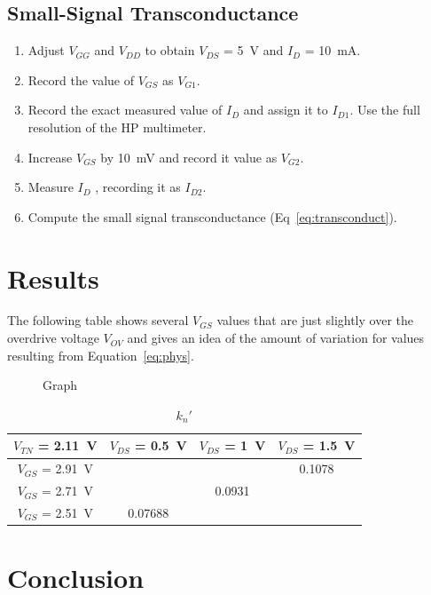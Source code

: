 \subsection{Small-Signal Transconductance}
\label{sec:nand}

\begin{enumerate}
\item Adjust $V_{GG}$ and $V_{DD}$ to obtain $V_{DS}$ = \SI{5}{V} and $I_D$ = \SI{10}{mA}.
\item Record the value of $V_{GS}$ as $V_{G1}$.
\item Record the exact measured value of $I_D$ and assign it to $I_{D1}$. Use the full resolution of the HP multimeter.
\item Increase $V_{GS}$ by \SI{10}{mV} and record it value as $V_{G2}$.
\item Measure $I_D$ , recording it as $I_{D2}$.
\item Compute the small signal transconductance (Eq~\ref{eq:transconduct}).
\end{enumerate}

\section{Results}
\label{sec:results}

The following table shows several $V_{GS}$ values that are just slightly over the overdrive voltage $V_{OV}$ and gives an idea of the amount of variation for values resulting from Equation~\ref{eq:phys}.

\begin{figure}[hbtp]
  \centering
  \resizebox{1.0\textwidth}{!}{}
  \caption{\label{fig:graph} Graph}
\end{figure}

\begin{table}[hbtp]
  \centering
  \begin{tabular}{c|ccc}
    $V_{TN}$ = \SI{2.11}{V} & $V_{DS}$ = \SI{0.5}{V} & $V_{DS}$ = \SI{1}{V} & $V_{DS}$ = \SI{1.5}{V} \\
    \hline
    $V_{GS}$ = \SI{2.91}{V} & & & 0.1078 \\
    $V_{GS}$ = \SI{2.71}{V} & & 0.0931 & \\
    $V_{GS}$ = \SI{2.51}{V} & 0.07688 & & \\
  \end{tabular}
  \caption{\label{tab:kn} $k_n'$}
\end{table}

\section{Conclusion}
\label{sec:conclusion}

